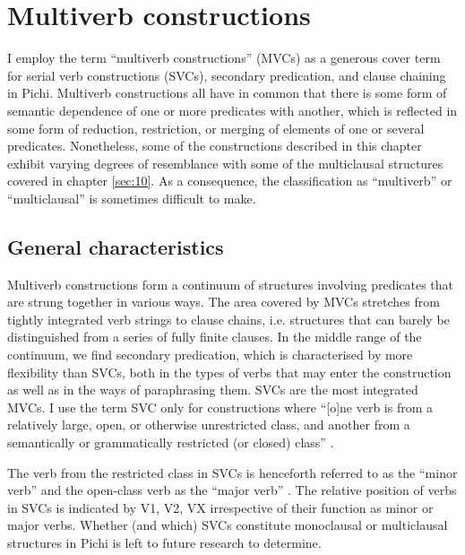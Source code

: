 \chapter{Multiverb constructions}

I employ the term “multiverb constructions” (MVCs) as a generous cover term for serial verb constructions (SVCs), secondary predication, and clause chaining in Pichi. Multiverb constructions all have in common that there is some form of semantic dependence of one or more predicates with another, which is reflected in some form of reduction, restriction, or merging of elements of one or several predicates. Nonetheless, some of the constructions described in this chapter exhibit varying degrees of resemblance with some of the multiclausal structures covered in chapter \ref{sec:10}. As a consequence, the classification as “multiverb” or “multiclausal” is sometimes difficult to make.

\section{General characteristics}\label{sec:11.1}

Multiverb constructions form a continuum of structures involving predicates that are strung together in various ways. The area covered by MVCs stretches from tightly integrated verb strings to clause chains, i.e. structures that can barely be distinguished from a series of fully finite clauses. In the middle range of the continuum, we find secondary predication, which is characterised by more flexibility than SVCs, both in the types of verbs that may enter the construction as well as in the ways of paraphrasing them. SVCs are the most integrated MVCs. I use the term SVC only for constructions where “[o]ne verb is from a relatively large, open, or otherwise unrestricted class, and another from a semantically or grammatically restricted (or closed) class” \citep[21]{Aikhenvald2006}.


The verb from the restricted class in SVCs is henceforth referred to as the “minor verb” and the open-class verb as the “major verb” \citep{Durie1997}. The relative position of verbs in SVCs is indicated by V1, \textsc{V2,} \textsc{VX} irrespective of their function as minor or major verbs. Whether (and which) SVCs constitute monoclausal or multiclausal structures in Pichi is left to future research to determine.



